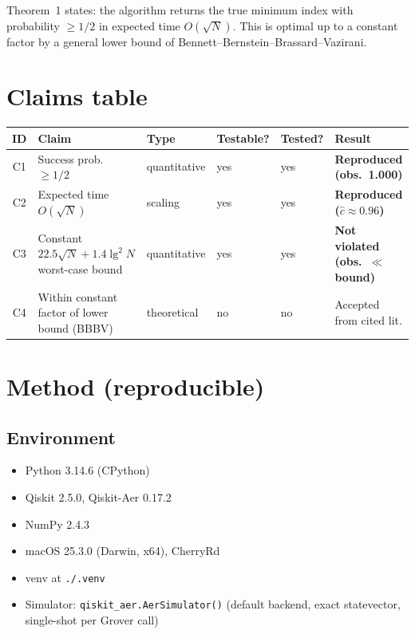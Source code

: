 \documentclass[11pt]{article}
\begin{document}
Theorem~1 states: the algorithm returns the true minimum index with
probability $\ge 1/2$ in expected time $O(\sqrt{N})$. This is optimal up to a
constant factor by a general lower bound of Bennett--Bernstein--Brassard--Vazirani.

\section{Claims table}
\begin{center}
\begin{tabular}{clllll}
\toprule
ID & Claim & Type & Testable? & Tested? & Result \\
\midrule
C1 & Success prob.\ $\ge 1/2$                          & quantitative & yes & yes & \textbf{Reproduced (obs.\ 1.000)} \\
C2 & Expected time $O(\sqrt{N})$                        & scaling      & yes & yes & \textbf{Reproduced ($\hat{c}\approx 0.96$)} \\
C3 & Constant $22.5\sqrt{N}+1.4\lg^2 N$ worst-case bound & quantitative & yes & yes & \textbf{Not violated (obs.\ $\ll$ bound)} \\
C4 & Within constant factor of lower bound (BBBV)       & theoretical  & no  & no  & Accepted from cited lit. \\
\bottomrule
\end{tabular}
\end{center}

\section{Method (reproducible)}

\subsection*{Environment}
\begin{itemize}
  \item Python 3.14.6 (CPython)
  \item Qiskit 2.5.0, Qiskit-Aer 0.17.2
  \item NumPy 2.4.3
  \item macOS 25.3.0 (Darwin, x64), CherryRd
  \item venv at \texttt{./.venv}
  \item Simulator: \verb|qiskit_aer.AerSimulator()| (default backend, exact
        statevector, single-shot per Grover call)
\end{itemize}
\end{document}
